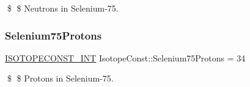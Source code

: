 \$ \$ Neutrons in Selenium-\/75. \mbox{\label{group___isotope_const-_selenium-_se75_ga55e623409d807066b64cc396ce751565}} 
\subsubsection{\texorpdfstring{Selenium75\+Protons}{Selenium75Protons}}
{\footnotesize\ttfamily \mbox{\hyperlink{group___isotope_const-_macros_ga5f18360b3e99483a35c32d789e62621c}{I\+S\+O\+T\+O\+P\+E\+C\+O\+N\+S\+T\+\_\+\+I\+NT}} Isotope\+Const\+::\+Selenium75\+Protons = 34}

\$ \$ Protons in Selenium-\/75. 